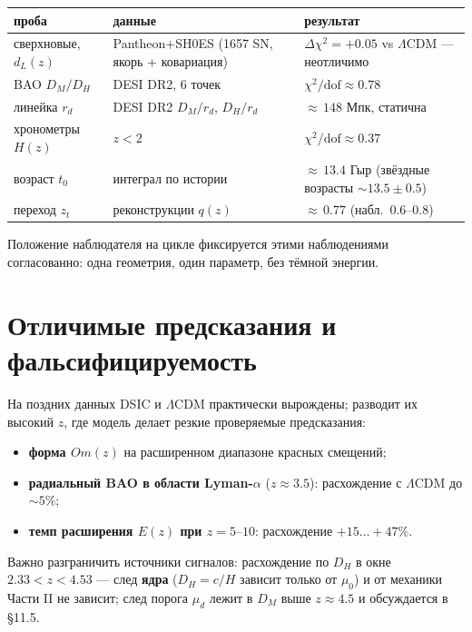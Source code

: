 \documentclass{article}
\begin{document}
\begin{table}[htbp]
\centering
\small
\begin{tabular}{@{}p{2.6cm}p{4.0cm}p{5.2cm}@{}}
\toprule
\textbf{проба} & \textbf{данные} & \textbf{результат} \\
\midrule
сверхновые, $d_L(z)$ & Pantheon+SH0ES (1657 SN, якорь + ковариация) & $\Delta\chi^2 = +0.05$ vs $\Lambda$CDM --- неотличимо \\
\addlinespace
BAO $D_M/D_H$ & DESI DR2, 6 точек & $\chi^2/\text{dof} \approx 0.78$ \\
\addlinespace
линейка $r_d$ & DESI DR2 $D_M/r_d$, $D_H/r_d$ & ${\approx}\,148$ Мпк, статична \\
\addlinespace
хронометры $H(z)$ & $z < 2$ & $\chi^2/\text{dof} \approx 0.37$ \\
\addlinespace
возраст $t_0$ & интеграл по истории & ${\approx}\,13.4$ Гыр (звёздные возрасты ${\sim}13.5 \pm 0.5$) \\
\addlinespace
переход $z_t$ & реконструкции $q(z)$ & ${\approx}\,0.77$ (набл.\ $0.6\text{--}0.8$) \\
\bottomrule
\end{tabular}
\end{table}

Положение наблюдателя на цикле фиксируется этими наблюдениями согласованно: одна геометрия, один параметр, без тёмной энергии.

\section{Отличимые предсказания и фальсифицируемость}

На поздних данных DSIC и $\Lambda$CDM практически вырождены; разводит их высокий $z$, где модель делает резкие проверяемые предсказания:
\begin{itemize}
  \item \textbf{форма $Om(z)$} на расширенном диапазоне красных смещений;
  \item \textbf{радиальный BAO в области Lyman-$\alpha$} ($z \approx 3.5$): расхождение с $\Lambda$CDM до ${\sim}5\%$;
  \item \textbf{темп расширения $E(z)$ при $z = 5\text{--}10$}: расхождение $+15\ldots+47\%$.
\end{itemize}
Важно разграничить источники сигналов: расхождение по $D_H$ в окне $2.33 < z < 4.53$ --- след \textbf{ядра} ($D_H = c/H$ зависит только от $\mu_0$) и от механики Части II не зависит; след порога $\mu_d$ лежит в $D_M$ выше $z \approx 4.5$ и обсуждается в \S11.5.
\end{document}
